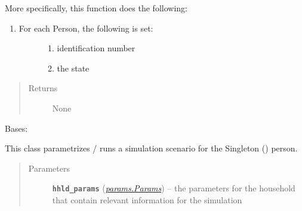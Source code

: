 \documentclass[letterpaper,10pt,english]{sphinxmanual}
\begin{document}
\begin{fulllineitems}
\begin{fulllineitems}
More specifically, this function does the following:
\begin{enumerate}
\item {} \begin{description}
\item[{For each Person, the following is set:}] \leavevmode\begin{enumerate}
\item {} 
identification number

\item {} 
the state

\end{enumerate}

\end{description}

\end{enumerate}
\begin{quote}\begin{description}
\item[{Returns}] \leavevmode
None

\end{description}\end{quote}

\end{fulllineitems}


\end{fulllineitems}


\begin{fulllineitems}
\label{scenario:scenario.Solo}
Bases: {\hyperref[scenario:scenario.Scenario]{\emph{}}}

This class parametrizes / runs a simulation scenario for the Singleton ({\hyperref[singleton:singleton.Singleton]{\emph{}}}) person.
\begin{quote}\begin{description}
\item[{Parameters}] \leavevmode
\textbf{\texttt{hhld\_params}} ({\hyperref[params:params.Params]{\emph{\emph{params.Params}}}}) -- the parameters for the household that contain relevant information     for the simulation

\end{description}\end{quote}

\end{fulllineitems}
\end{document}
